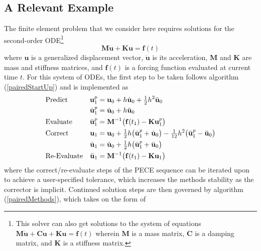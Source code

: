 \subsection{A Relevant Example}
\label{sec:solve2ndOrderODE}

The finite element problem that we consider here requires solutions for the second-order ODE\footnote{
    This solver can also get solutions to the system of equations $\mathbf{M} \ddot{\mathbf{u}} + \mathbf{C} \dot{\mathbf{u}} + \mathbf{K} \mathbf{u} = \mathbf{f}(t)$ wherein $\mathbf{M}$ is a mass matrix, $\mathbf{C}$ is a damping matrix, and $\mathbf{K}$ is a stiffness matrix.
}
\begin{displaymath}
    \mathbf{M} \ddot{\mathbf{u}} + \mathbf{K}\mathbf{u} = \mathbf{f}(t)
\end{displaymath}
where $\mathbf{u}$ is a generalized displacement vector, $\ddot{\mathbf{u}}$ is its acceleration, $\mathbf{M}$ and $\mathbf{K}$ are mass and stiffness matrices, and $\mathbf{f}(t)$ is a forcing function evaluated at current time $t$.  For this system of ODEs, the first step to be taken follows algorithm (\ref{pairedStartUp}) and is implemented as
\begin{subequations}
    \notag
    \begin{align}
    \mbox{} & \text{Predict} & 
    \mathbf{u}_1^p & = \mathbf{u}_0 + h \dot{\mathbf{u}}_0 +
    \tfrac{1}{2} h^2 \ddot{\mathbf{u}}_0 \\
    \mbox{} & &
    \dot{\mathbf{u}}^p_1 & = \dot{\mathbf{u}}_0 + h \ddot{\mathbf{u}}_0 \\
    \mbox{} & \text{Evaluate} &
    \ddot{\mathbf{u}}^p_1 & = \mathbf{M}^{-1} \bigl( \mathbf{f}(t_{1} ) - 
    \mathbf{K} \mathbf{u}_1^p \bigr) \\
    \mbox{} & \text{Correct} &
    \mathbf{u}_1 & = \mathbf{u}_0 + \tfrac{1}{2} h 
    \bigl( \dot{\mathbf{u}}^p_1 + \dot{\mathbf{u}}_0 \bigr) -
    \tfrac{1}{12} h^2 \bigl( \ddot{\mathbf{u}}^p_1 - \ddot{\mathbf{u}}_0 \bigr) \\
    \mbox{} & &
    \dot{\mathbf{u}}_1 & = \dot{\mathbf{u}}_0 + \tfrac{1}{2} h 
    \bigl( \ddot{\mathbf{u}}_1^p + \ddot{\mathbf{u}}_0 \bigr) \\
    \mbox{} & \text{Re-Evaluate} &
    \ddot{\mathbf{u}}_1 & = \mathbf{M}^{-1} \bigl( \mathbf{f}(t_1 ) - 
    \mathbf{K} \mathbf{u}_1 \bigr)
    \end{align}
\end{subequations}
where the correct\slash re-evaluate steps of the PECE sequence can be iterated upon to achieve a user-specified tolerance, which increases the methods stability as the corrector is implicit.  Continued solution steps are then governed by algorithm (\ref{pairedMethods}), which takes on the form of
